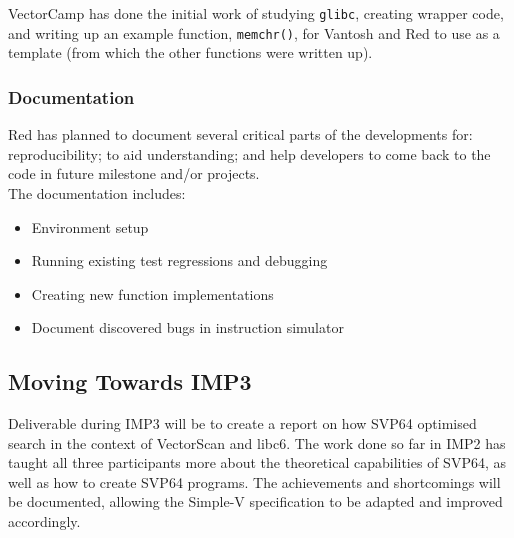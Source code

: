 VectorCamp has done the initial work of studying \texttt{glibc},
creating wrapper code, and writing up an example function, \texttt{memchr()},
for Vantosh and Red to use as a template (from which the other functions were
written up).

\subsubsection{Documentation}

Red has planned to document several critical parts of the developments for:
reproducibility; to aid understanding; and help developers to come back to
the code in future milestone and/or projects.\\

The documentation includes:

\begin{itemize}
  \item Environment setup
  \item Running existing test regressions and debugging
  \item Creating new function implementations
  \item Document discovered bugs in instruction simulator
\end{itemize}

\subsection{Moving Towards IMP3}

Deliverable during IMP3 will be to create a report on how SVP64 optimised
search in the context of VectorScan and libc6. The work done so far in IMP2
has taught all three participants more about the theoretical capabilities
of SVP64, as well as how to create SVP64 programs. The achievements and
shortcomings will be documented, allowing the Simple-V specification to
be adapted and improved accordingly.

\clearpage













\clearpage
